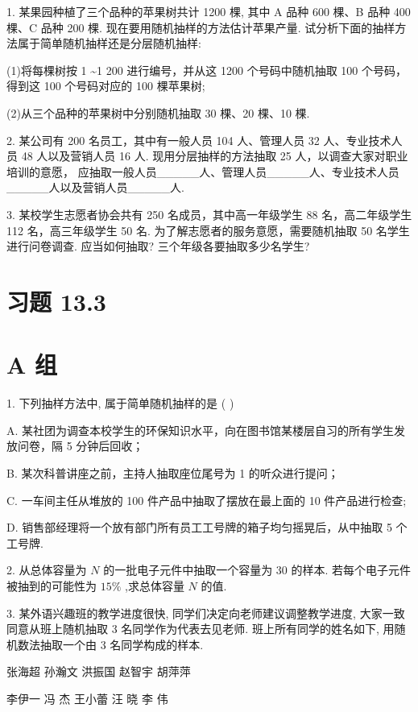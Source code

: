 \documentclass[10pt]{article}
\begin{document}
1. 某果园种植了三个品种的苹果树共计 1200 棵, 其中 A 品种 600 棵、B 品种 400 棵、C 品种 200 棵. 现在要用随机抽样的方法估计苹果产量. 试分析下面的抽样方法属于简单随机抽样还是分层随机抽样:

(1)将每棵树按 1 \textasciitilde  1 200 进行编号，并从这 1200 个号码中随机抽取 100 个号码，得到这 100 个号码对应的 100 棵苹果树;

(2)从三个品种的苹果树中分别随机抽取 30 棵、20 棵、10 棵.

2. 某公司有 200 名员工，其中有一般人员 104 人、管理人员 32 人、专业技术人员 48 人以及营销人员 16 人. 现用分层抽样的方法抽取 25 人，以调查大家对职业培训的意愿， 应抽取一般人员\_\_\_\_\_人、管理人员\_\_\_\_\_人、专业技术人员\_\_\_\_\_人以及营销人员\_\_\_\_\_人.

3. 某校学生志愿者协会共有 250 名成员，其中高一年级学生 88 名，高二年级学生 112 名，高三年级学生 50 名. 为了解志愿者的服务意愿，需要随机抽取 50 名学生进行问卷调查. 应当如何抽取? 三个年级各要抽取多少名学生?

\section*{习题 13.3}

\section*{A 组}

1. 下列抽样方法中, 属于简单随机抽样的是 ( )

A. 某社团为调查本校学生的环保知识水平，向在图书馆某楼层自习的所有学生发放问卷，隔 5 分钟后回收；

B. 某次科普讲座之前，主持人抽取座位尾号为 1 的听众进行提问；

C. 一车间主任从堆放的 100 件产品中抽取了摆放在最上面的 10 件产品进行检查;

D. 销售部经理将一个放有部门所有员工工号牌的箱子均匀摇晃后，从中抽取 5 个工号牌.

2. 从总体容量为 \(N\) 的一批电子元件中抽取一个容量为 30 的样本. 若每个电子元件被抽到的可能性为 \({15}\%\) ,求总体容量 \(N\) 的值.

3. 某外语兴趣班的教学进度很快, 同学们决定向老师建议调整教学进度, 大家一致同意从班上随机抽取 3 名同学作为代表去见老师. 班上所有同学的姓名如下, 用随机数法抽取一个由 3 名同学构成的样本.



张海超 孙瀚文 洪振国 赵智宇 胡萍萍

李伊一 冯 杰 王小蕾 汪 晓 李 伟
\end{document}
